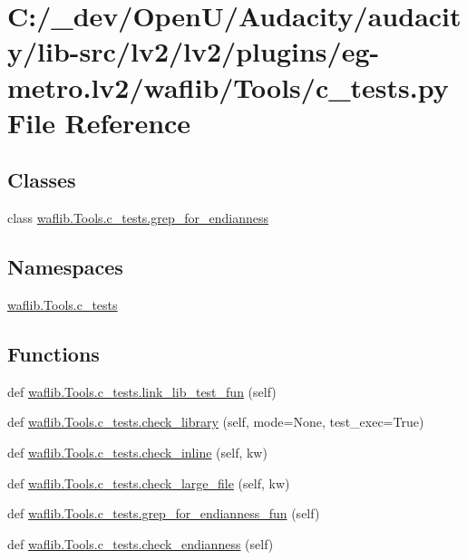 \hypertarget{lv2_2plugins_2eg-metro_8lv2_2waflib_2_tools_2c__tests_8py}{}\section{C\+:/\+\_\+dev/\+Open\+U/\+Audacity/audacity/lib-\/src/lv2/lv2/plugins/eg-\/metro.lv2/waflib/\+Tools/c\+\_\+tests.py File Reference}
\label{lv2_2plugins_2eg-metro_8lv2_2waflib_2_tools_2c__tests_8py}
\subsection*{Classes}
\begin{DoxyCompactItemize}
\item 
class \hyperlink{classwaflib_1_1_tools_1_1c__tests_1_1grep__for__endianness}{waflib.\+Tools.\+c\+\_\+tests.\+grep\+\_\+for\+\_\+endianness}
\end{DoxyCompactItemize}
\subsection*{Namespaces}
\begin{DoxyCompactItemize}
\item 
 \hyperlink{namespacewaflib_1_1_tools_1_1c__tests}{waflib.\+Tools.\+c\+\_\+tests}
\end{DoxyCompactItemize}
\subsection*{Functions}
\begin{DoxyCompactItemize}
\item 
def \hyperlink{namespacewaflib_1_1_tools_1_1c__tests_a58fcfbe9b3ba09e1a057dc1276435776}{waflib.\+Tools.\+c\+\_\+tests.\+link\+\_\+lib\+\_\+test\+\_\+fun} (self)
\item 
def \hyperlink{namespacewaflib_1_1_tools_1_1c__tests_a6769fa909685b6d42bde7746f3e59a64}{waflib.\+Tools.\+c\+\_\+tests.\+check\+\_\+library} (self, mode=None, test\+\_\+exec=True)
\item 
def \hyperlink{namespacewaflib_1_1_tools_1_1c__tests_a8c36c48a71d56e13d6a7973972ef7fb8}{waflib.\+Tools.\+c\+\_\+tests.\+check\+\_\+inline} (self, kw)
\item 
def \hyperlink{namespacewaflib_1_1_tools_1_1c__tests_ac29778f60925677c62b37a4da6a94322}{waflib.\+Tools.\+c\+\_\+tests.\+check\+\_\+large\+\_\+file} (self, kw)
\item 
def \hyperlink{namespacewaflib_1_1_tools_1_1c__tests_a94db04af071d40c6a2b181ae0925389c}{waflib.\+Tools.\+c\+\_\+tests.\+grep\+\_\+for\+\_\+endianness\+\_\+fun} (self)
\item 
def \hyperlink{namespacewaflib_1_1_tools_1_1c__tests_a83231aa06753183ca283a2d9b4cf39ce}{waflib.\+Tools.\+c\+\_\+tests.\+check\+\_\+endianness} (self)
\end{DoxyCompactItemize}
